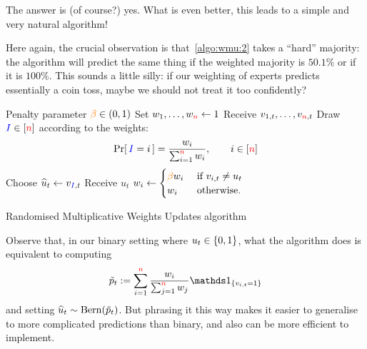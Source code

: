 The answer is (of course?) yes. What is even better, this leads to a simple and very natural algorithm! 

Here again, the crucial observation is that~\cref{algo:wmu:2} takes a ``hard'' majority: the algorithm will predict the same thing if the weighted majority is $50.1\%$ or if it is $100\%$. This sounds a little silly: if our weighting of experts predicts essentially a coin toss, maybe we should not treat it too confidently?

\begin{algorithm}[htbp]
\begin{algorithmic}[1]
    \Require Penalty parameter $\textcolor{orange}{\beta}\in(0,1)$
    \State Set $w_1,\dots, w_{\textcolor{red}{n}} \gets  1$
        \State Receive $v_{1,t},\dots, v_{{\textcolor{red}{n}},t}$
        \State Draw $\textcolor{blue}{I}\in[{\textcolor{red}{n}}]$ according to the weights:
        \[
            \probaOf{\blue{I} = i} = \frac{w_i}{\sum_{i=1}^\ns w_i}, \qquad i\in[\ns]
        \]
        \State Choose $\widehat{u}_t \gets v_{\textcolor{blue}{I},t}$ 
        \State Receive $u_t$ 
         
        \State $w_i \gets \begin{cases}
            \textcolor{orange}{\beta} w_i & \text{ if } v_{i,t} \neq u_t\\
            w_i & \text{ otherwise.}
            \end{cases}$ \label{alg:experts:randmwu:beta}
        \EndFor
    \EndFor
\end{algorithmic}
\caption{Randomised Multiplicative Weights Updates algorithm}\label{algo:wmu:3}
\end{algorithm}
Observe that, in our binary setting where $u_t\in\{0,1\}$, what the algorithm does is equivalent to computing 
\[
    \tilde{p}_t \eqdef \sum_{i=1}^\ns \frac{w_i}{\sum_{j=1}^\ns w_j}\indic{v_{i,t}=1}
\]
and setting $\widehat{u}_t\sim \operatorname{Bern}( \tilde{p}_t ) $. But phrasing it this way makes it easier to generalise to more complicated predictions than binary, and also can be more efficient to implement.

